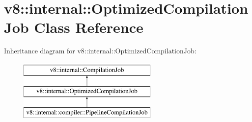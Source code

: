 \hypertarget{classv8_1_1internal_1_1OptimizedCompilationJob}{}\section{v8\+:\+:internal\+:\+:Optimized\+Compilation\+Job Class Reference}
\label{classv8_1_1internal_1_1OptimizedCompilationJob}
Inheritance diagram for v8\+:\+:internal\+:\+:Optimized\+Compilation\+Job\+:\begin{figure}[H]
\begin{center}
\leavevmode
\includegraphics[height=3.000000cm]{classv8_1_1internal_1_1OptimizedCompilationJob}
\end{center}
\end{figure}
